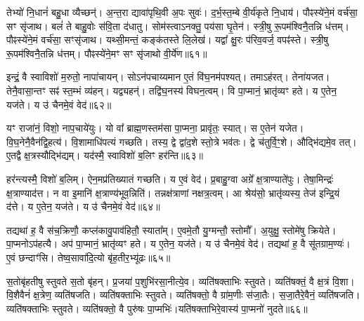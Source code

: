 तेभ्यो॑ नि॒धानं॑ बहु॒धा व्यैच्छन्॑।
अ॒न्त॒रा द्यावा॑पृथि॒वी अ॒पः सुवः॑।
द॒र्भ॒स्त॒म्बे वी॒र्य॑कृते नि॒धाय॑।
पौꣴस्ये॑ने॒मं वर्च॑सा॒ सꣳ सृ॑जाथ।
बलं॑ ते बाहु॒वोः स॑वि॒ता द॑धातु।
सोम॑स्त्वा\-ऽनक्तु॒ पय॑सा घृ॒तेन॑।
स्त्री॒षु रू॒पम॑श्विनै॒तन्नि ध॑त्तम्।
पौꣴस्ये॑ने॒मं वर्च॑सा॒ सꣳसृ॑जाथ।
यथ्सी॒मन्तं॒ कङ्क॑तस्ते लि॒लेख॑।
यद्वा᳚ क्षु॒रः प॑रिव॒वर्ज॒ वपꣴ॑स्ते।
स्त्री॒षु रू॒पम॑श्विनै॒तन्नि ध॑त्तम्।
पौꣴस्ये॑ने॒मꣳ सꣳ सृ॑जाथो वी॒र्ये॑ण॥६१॥\ip\anuvakamend[अवा᳚स्राग्दी॒क्षा व॒शिनी॒ ह्यु॑ग्रा\-ऽद॑धाद्व॒वर्ज॒ वपꣴ॑ स्ते॒ द्वे च॑]

इन्द्रं॒ वै स्वाविशो॑ म॒रुतो॒ नापा॑चायन्।
सोऽन॑पचाय्यमान ए॒तं वि॑घ॒नम॑पश्यत्।
तमाऽह॑रत्।
तेना॑यजत।
तेनै॒वासा॒न्तꣳ सꣴ॑ स्त॒म्भं व्य॑हन्।
यद्व्यहन्॑।
तद्वि॑घ॒नस्य॑ विघन॒त्वम्।
वि पा॒प्मानं॒ भ्रातृ॑व्यꣳ हते।
य ए॒तेन॒ यज॑ते।
य उ॑ चैनमे॒वं वेद॑॥६२॥\ip

यꣳ राजा॑नं॒ विशो॒ नाप॒चाये॑युः।
यो वा᳚ ब्राह्म॒णस्तम॑सा पा॒प्मना॒ प्रावृ॑तः॒ स्यात्।
स ए॒तेन॑ यजेत।
वि॒घ॒नेनै॒वैन॑द्वि॒हत्य॑।
वि॒शामाधि॑पत्यं गच्छति।
तस्य॒ द्वे द्वा॑द॒शे स्तो॒त्रे भव॑तः।
द्वे च॑तुर्वि॒ꣳ॒शे।
औद्भि॑द्यमे॒व तत्।
ए॒तद्वै क्ष॒त्रस्यौद्भि॑द्यम्।
यद॑स्मै॒ स्वाविशो॑ ब॒लिꣳ हर॑न्ति॥६३॥\ip

हर॑न्त्यस्मै॒ विशो॑ ब॒लिम्।
ऐन॒मप्र॑तिख्यातं गच्छति।
य ए॒वं वेद॑।
प्र॒बाहु॒ग्वा अग्रे᳚ क्ष॒त्राण्याते॑पुः।
तेषा॒मिन्द्रः॑ क्ष॒त्राण्याद॑त्त।
न वा इ॒मानि॑ क्ष॒त्राण्य॑भूव॒न्निति॑।
तन्नक्ष॑त्राणां नक्षत्र॒त्वम्।
आ श्रेय॑सो॒ भ्रातृ॑व्यस्य॒ तेज॑ इन्द्रि॒यं द॑त्ते।
य ए॒तेन॒ यज॑ते।
य उ॑ चैनमे॒वं वेद॑॥६४॥\ip

तद्यथा॑ ह॒ वै स॑च॒क्रिणौ॒ कप्ल॑कावु॒पाव॑हितौ॒ स्याता᳚म्।
ए॒वमे॒तौ यु॒ग्मन्तौ॒ स्तोमौ᳚।
अ॒युक्षु॒ स्तोमे॑षु क्रियेते।
पा॒प्मनो\-ऽप॑हत्यै।
अप॑ पा॒प्मानं॒ भ्रातृ॑व्यꣳ हते।
य ए॒तेन॒ यज॑ते।
य उ॑ चैनमे॒वं वेद॑।
तद्यथा॑ ह॒ वै सू॑तग्राम॒ण्यः॑।
ए॒वं छन्दाꣳ॑सि।
तेष्व॒सावा॑दि॒त्यो बृ॑ह॒तीर॒भ्यू॑ढः॥६५॥\ip

स॒तोबृ॑हतीषु स्तुवते स॒तो बृ॑हन्।
प्र॒जया॑ प॒शुभि॑रसा॒नीत्ये॒व।
व्यति॑षक्ताभिः स्तुवते।
व्यति॑षक्तं॒ वै क्ष॒त्रं वि॒शा।
वि॒शैवैनं॑ क्ष॒त्रेण॒ व्यति॑षजति।
व्यति॑षक्ताभिः स्तुवते।
व्यति॑षक्तो॒ वै ग्रा॑म॒णीः स॑जा॒तैः।
स॒जा॒तैरे॒वैनं॒ व्यति॑षजति।
व्यति॑षक्ताभिः स्तुवते।
व्यति॑षक्तो॒ वै पुरु॑षः पा॒प्मभिः॑।यति॑षक्ताभिरे॒वास्य॑ पा॒प्मनो॑ नुदते॥६६॥\ip\anuvakamend[वेद॒ हर॑न्त्येनमे॒वं वेदा॒भ्यू॑ढः पा॒प्मभि॒रेकं॑ च]


\clearpage
{}
\setcounter{anuvakam}{0}

